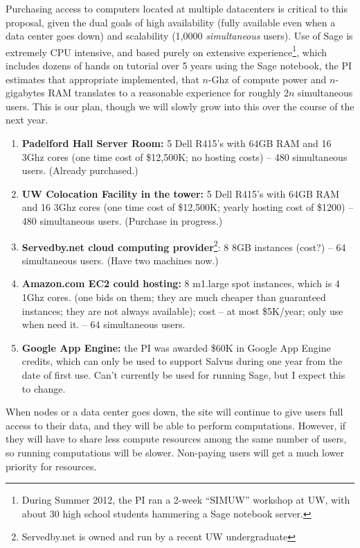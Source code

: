 \documentclass[11pt]{article}
\begin{document}
Purchasing access to computers located at multiple datacenters is
critical to this proposal, given the dual goals of high availability
(fully available even when a data center goes down) and scalability
(1,0000 {\em simultaneous} users).  Use of Sage is extremely CPU
intensive, and based purely on extensive experience\footnote{During
  Summer 2012, the PI ran a 2-week ``SIMUW'' workshop at UW, with
  about 30 high school students hammering a Sage notebook server.},
which includes dozens of hands on tutorial over 5 years using the Sage
notebook, the PI estimates that appropriate implemented, that $n$-Ghz
of compute power and $n$-gigabytes RAM translates to a reasonable
experience for roughly $2n$ simultaneous users.  This is our plan,
though we will slowly grow into this over the course of the next year.

\begin{enumerate}
\item {\bf Padelford Hall Server Room:} 5 Dell R415's with 64GB RAM
  and 16 3Ghz cores (one time cost of \$12,500K; no hosting costs) --
  480 simultaneous users.   (Already purchased.)

\item {\bf UW Colocation Facility in the tower:} 5 Dell R415's with
  64GB RAM and 16 3Ghz cores (one time cost of \$12,500K; yearly
  hosting cost of \$1200) -- 480 simultaneous users.  (Purchase in progress.)

\item {\bf Servedby.net cloud computing
  provider}\footnote{Servedby.net is owned and run by a recent UW 
  undergraduate}: 8 8GB instances (cost?) -- 64 simultaneous users.
  (Have two machines now.)

\item {\bf Amazon.com EC2 could hosting:} 8 m1.large spot instances,
  which is 4 1Ghz cores. (one bids on them; they are much cheaper than
  guaranteed instances; they are not always available); cost -- at
  most \$5K/year; only use when need it. -- 64 simultaneous users.

\item {\bf Google App Engine:} the PI was awarded \$60K in Google App
  Engine credits, which can only be used to support Salvus during one
  year from the date of first use.  Can't currently be used for
  running Sage, but I expect this to change.
\end{enumerate}

When nodes or a data center goes down, the site will continue to give
users full access to their data, and they will be able to perform
computations.  However, if they will have to share less compute
resources among the same number of users, so running computations will
be slower.  Non-paying users will get a much lower priority for
resources.   
\end{document}
